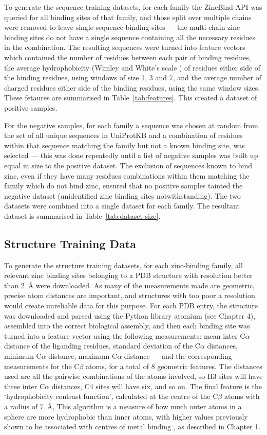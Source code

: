 To generate the sequence training datasets, for each family the ZincBind API was queried for all binding sites of that family, and those split over multiple chains were removed to leave single sequence binding sites --- the multi-chain zinc binding sites do not have a single sequence containing all the necessary residues in the combination. The resulting sequences were turned into feature vectors which contained the number of residues between each pair of binding residues, the average hydrophobicity (Wimley and White’s scale \cite{wimley:hphob}) of residues either side of the binding residues, using windows of size 1, 3 and 7, and the average number of charged residues either side of the binding residues, using the same window sizes. These fetaures are summarised in Table~\ref{tab:features}. This created a dataset of positive samples.

For the negative samples, for each family a sequence was chosen at random from the set of all unique sequences in UniProtKB and a combination of residues within that sequence matching the family but not a known binding site, was selected --- this was done repeatedly until a list of negative samples was built up equal in size to the
positive dataset. The exclusion of sequences known to bind zinc, even if they have many residues combinations within them matching the family which do not bind zinc, ensured that no positive samples tainted the negative dataset (unidentified zinc binding sites notwithstanding). The two datasets were combined into a single dataset for each family. The resultant dataset is summarised in Table~\ref{tab:dataset-size}.

\subsection{Structure Training Data}

To generate the structure training datasets, for each zinc-binding family, all relevant zinc binding sites belonging to a PDB structure with resolution better than 2~{\AA} were downloaded. As many of the measurements made are geometric, precise atom distances are important, and structures with too poor a resolution would create unreliable data for this purpose. For each PDB entry, the structure was downloaded and parsed using the Python library atomium (see Chapter 4), assembled into the correct biological assembly, and then each binding site was turned into a feature vector using the following measurements: mean inter C$\alpha$ distance of the liganding residues, standard deviation of the C$\alpha$ distances, minimum C$\alpha$ distance, maximum C$\alpha$ distance --- and the corresponding measurements for the C$\beta$ atoms, for a total of 8 geometric features. The distances used are all the pairwise combinations of the atoms involved, so H3 sites will have three inter C$\alpha$ distances, C4 sites will have six, and so on. The final feature is the `hydrophobicity contrast function', calculated at the centre of the C$\beta$ atoms with a radius of 7~{\AA}, This algorithm is a measure of how much outer atoms in a sphere are more hydrophobic than inner atoms, with higher values previously shown to be associated
with centres of metal binding \cite{yamashita1990metal,gregory1993prediction}, as described in Chapter 1.

